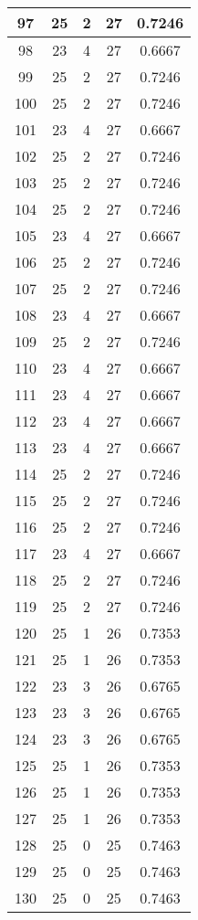 \documentclass[letterpaper, 12pt]{article}
\begin{document}
\begin{longtable}{|c|c|c|c|c|}
\hline
97 & 25 & 2 & 27 & 0.7246 \\
\hline
98 & 23 & 4 & 27 & 0.6667 \\
\hline
99 & 25 & 2 & 27 & 0.7246 \\
\hline
100 & 25 & 2 & 27 & 0.7246 \\
\hline
101 & 23 & 4 & 27 & 0.6667 \\
\hline
102 & 25 & 2 & 27 & 0.7246 \\
\hline
103 & 25 & 2 & 27 & 0.7246 \\
\hline
104 & 25 & 2 & 27 & 0.7246 \\
\hline
105 & 23 & 4 & 27 & 0.6667 \\
\hline
106 & 25 & 2 & 27 & 0.7246 \\
\hline
107 & 25 & 2 & 27 & 0.7246 \\
\hline
108 & 23 & 4 & 27 & 0.6667 \\
\hline
109 & 25 & 2 & 27 & 0.7246 \\
\hline
110 & 23 & 4 & 27 & 0.6667 \\
\hline
111 & 23 & 4 & 27 & 0.6667 \\
\hline
112 & 23 & 4 & 27 & 0.6667 \\
\hline
113 & 23 & 4 & 27 & 0.6667 \\
\hline
114 & 25 & 2 & 27 & 0.7246 \\
\hline
115 & 25 & 2 & 27 & 0.7246 \\
\hline
116 & 25 & 2 & 27 & 0.7246 \\
\hline
117 & 23 & 4 & 27 & 0.6667 \\
\hline
118 & 25 & 2 & 27 & 0.7246 \\
\hline
119 & 25 & 2 & 27 & 0.7246 \\
\hline
120 & 25 & 1 & 26 & 0.7353 \\
\hline
121 & 25 & 1 & 26 & 0.7353 \\
\hline
122 & 23 & 3 & 26 & 0.6765 \\
\hline
123 & 23 & 3 & 26 & 0.6765 \\
\hline
124 & 23 & 3 & 26 & 0.6765 \\
\hline
125 & 25 & 1 & 26 & 0.7353 \\
\hline
126 & 25 & 1 & 26 & 0.7353 \\
\hline
127 & 25 & 1 & 26 & 0.7353 \\
\hline
128 & 25 & 0 & 25 & 0.7463 \\
\hline
129 & 25 & 0 & 25 & 0.7463 \\
\hline
130 & 25 & 0 & 25 & 0.7463 \\

\end{longtable}
\end{document}
